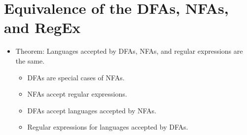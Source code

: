 
\section{Equivalence of the DFAs, NFAs, and RegEx}
\begin{itemize}
    \item Theorem: Languages accepted by DFAs, NFAs, and regular expressions are the same.
    \begin{itemize}
        \item DFAs are special cases of NFAs.
        \item NFAs accept regular expressions.
        \item DFAs accept languages accepted by NFAs.
        \item Regular expressions for languages accepted by DFAs.
    \end{itemize}
\end{itemize}

